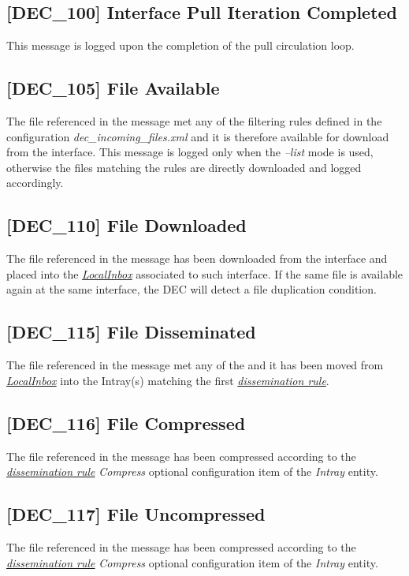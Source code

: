 \documentclass[dec_sum_main.tex]{subfiles}
\begin{document}
\label{DEC100}
\subsection{[DEC\_100] Interface Pull Iteration Completed}
This message is logged upon the completion of the pull circulation loop.

\label{DEC105}
\subsection{[DEC\_105] File Available}
The file referenced in the message met any of the filtering rules defined in the configuration \textit{dec\_incoming\_files.xml} and it is therefore available for download from the interface. This message is logged only when the \textit{--list} mode is used, otherwise the files matching the rules are directly downloaded and logged accordingly. 

\label{DEC110}
\subsection{[DEC\_110] File Downloaded}
The file referenced in the message has been downloaded from the interface and placed into the \hyperref[LocalInbox]{\textit{LocalInbox}} associated to such interface. If the same file is available again at the same interface, the DEC will detect a file duplication condition.

\label{DEC115}
\subsection{[DEC\_115] File Disseminated}
The file referenced in the message met any of the and it has been moved from \hyperref[LocalInbox]{\textit{LocalInbox}} into the Intray(s) matching the first \hyperref[Dissemination rules]{\textit{dissemination rule}}.

\label{DEC116}
\subsection{[DEC\_116] File Compressed}
The file referenced in the message has been compressed according to the \hyperref[Dissemination rules]{\textit{dissemination rule}} \textit{Compress} optional configuration item of the \textit{Intray} entity.

\label{DEC117}
\subsection{[DEC\_117] File Uncompressed}
The file referenced in the message has been compressed according to the \hyperref[Dissemination rules]{\textit{dissemination rule}} \textit{Compress} optional configuration item of the \textit{Intray} entity.
\end{document}
